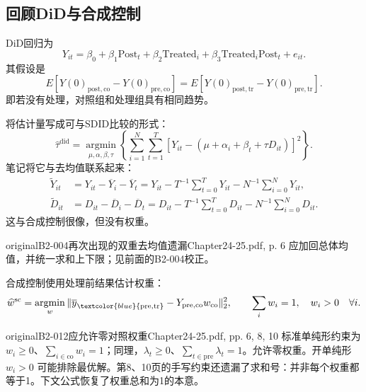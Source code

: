 \subsection{回顾DiD与合成控制}
DiD回归为
\[
Y_{it}=\beta_0+\beta_1\mathrm{Post}_t+\beta_2\mathrm{Treated}_i
+\beta_3\mathrm{Treated}_i\mathrm{Post}_t+e_{it}.
\]
其假设是
\[
E[Y(0)_{\mathrm{post,co}}-Y(0)_{\mathrm{pre,co}}]
=E[Y(0)_{\mathrm{post,tr}}-Y(0)_{\mathrm{pre,tr}}].
\]
即若没有处理，对照组和处理组具有相同趋势。

将估计量写成可与SDID比较的形式：
\[
\widehat\tau^{\mathrm{did}}
=\operatorname*{argmin}_{\mu,\alpha,\beta,\tau}
\left\{\sum_{i=1}^{N}\sum_{t=1}^{T}
[Y_{it}-(\mu+\alpha_i+\beta_t+\tau D_{it})]^2\right\}.
\]
笔记将它与去均值联系起来：
\begin{align*}
\widetilde Y_{it}
&=Y_{it}-\overline Y_i-\overline Y_t
=Y_{it}-T^{-1}\sum_{t=0}^{T}Y_{it}-N^{-1}\sum_{i=0}^{N}Y_{it},\\
\widetilde D_{it}
&=D_{it}-\overline D_i-\overline D_t
=D_{it}-T^{-1}\sum_{t=0}^{T}D_{it}-N^{-1}\sum_{i=0}^{N}D_{it}.
\end{align*}
这与合成控制很像，但没有权重。
\begin{reviewnote}{original}{B2-004}{再次出现的双重去均值遗漏}{Chapter24-25.pdf, p. 6}
应加回总体均值，并统一求和上下限；见前面的B2-004校正。
\par{}
\end{reviewnote}

合成控制使用处理前结果估计权重：
\[
\widehat w^{\mathrm{sc}}
=\operatorname*{argmin}_{w}
\|\overline y_{\textcolor{blue}{\mathrm{pre,tr}}}-Y_{\mathrm{pre,co}}w_{\mathrm{co}}\|_2^2,
\qquad \sum_iw_i=1,\quad w_i>0\quad\forall i.
\]
\begin{reviewnote}{original}{B2-012}{应允许零对照权重}{Chapter24-25.pdf, pp. 6, 8, 10}
标准单纯形约束为 \(w_i\geq0\)、\(\sum_{i\in\mathrm{co}}w_i=1\)；同理，\(\lambda_t\geq0\)、\(\sum_{t\in\mathrm{pre}}\lambda_t=1\)。允许零权重。开单纯形 \(w_i>0\) 可能排除最优解。第8、10页的手写约束还遗漏了求和号：并非每个权重都等于1。下文公式恢复了权重总和为1的本意。
\par{}
\end{reviewnote}

